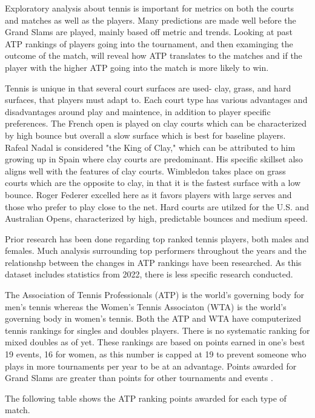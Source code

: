 \documentclass[12pt]{article}
\begin{document}
Exploratory analysis about tennis is important for metrics on both the
courts and matches as well as the players. Many predictions are made well 
before the Grand Slams are played, mainly based off metric and trends. 
Looking at past ATP rankings of players going into the tournament, and then 
examinging the outcome of the match, will reveal how ATP translates to the 
matches and if the player with the higher ATP going into the match is more 
likely to win.

Tennis is unique in that several court surfaces are used- clay, grass, and hard 
surfaces, that players must adapt to. Each court type has various advantages and
disadvantages around play and maintence, in addition to player specific preferences.
The French open is played on clay courts which can be characterized by high bounce
but overall a slow surface which is best for baseline players. Rafeal Nadal is 
considered "the King of Clay," which can be attributed to him growing up in Spain
where clay courts are predominant. His specific skillset also aligns well with the
features of clay courts. Wimbledon takes place on grass courts which are the opposite
to clay, in that it is the fastest surface with a low bounce. Roger Federer excelled
here as it favors players with large serves and those who prefer to play close to the
net. Hard courts are utilzed for the U.S. and Australian Opens, characterized by high,
predictable bounces and medium speed. 

Prior research has been done regarding top ranked tennis players, both males and 
females. Much analysis surrounding top performers throughout the years and the 
relationshp between the changes in ATP rankings have been researched. As this 
dataset includes statistics from 2022, there is less specific research conducted.

The Association of Tennis Professionals (ATP) is the world's governing
body for men's tennis whereas the Women's Tennis Associaton (WTA)
is the world's governing body in women's tennis. Both the ATP and
WTA have computerized tennis rankings for singles and doubles players.
There is no systematic ranking for mixed doubles as of yet. These
rankings are based on points earned in one's best 19 events, 16 for women,
as this number is capped at 19 to prevent someone who plays in more tournaments
per year to be at an advantage. Points awarded for Grand Slams are greater
than points for other tournaments and events \citet{Nag2022Tennis}.

The following table shows the ATP ranking points awarded for each type of match.
\end{document}
